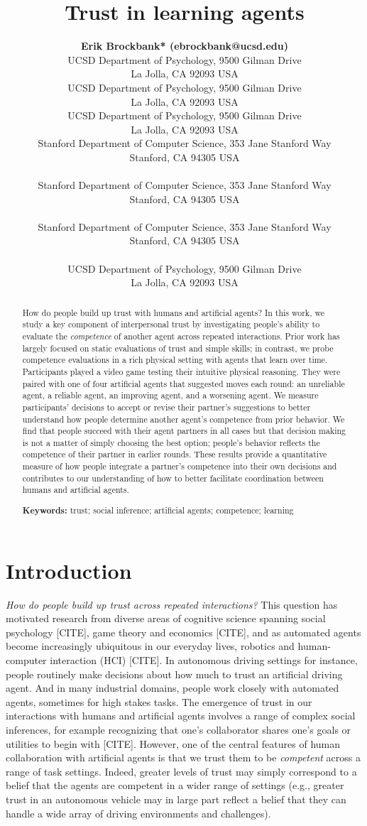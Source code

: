 \documentclass[10pt,letterpaper]{article}
\title{Trust in learning agents}
\author{
  {
  \large \bf Erik Brockbank* (ebrockbank@ucsd.edu)} \\
  UCSD Department of Psychology, 9500 Gilman Drive \\
  La Jolla, CA 92093 USA
  \AND {\large \bf Haoliang Wang* (haw027@ucsd.edu)} \\
  UCSD Department of Psychology, 9500 Gilman Drive \\
  La Jolla, CA 92093 USA
  \AND {\large \bf Justin Yang (juy003@ucsd.edu)} \\
  UCSD Department of Psychology, 9500 Gilman Drive \\
  La Jolla, CA 92093 USA
  \AND {\large \bf Suvir Mirchandani (suvir@cs.stanford.edu)} \\
  Stanford Department of Computer Science, 353 Jane Stanford Way \\
  Stanford, CA 94305 USA \\
  \AND {\large \bf Erdem Biyik (ebiyik@stanford.edu)} \\
  Stanford Department of Computer Science, 353 Jane Stanford Way \\
  Stanford, CA 94305 USA \\
  \AND {\large \bf Dorsa Sadigh (dorsa@cs.stanford.edu)} \\
  Stanford Department of Computer Science, 353 Jane Stanford Way \\
  Stanford, CA 94305 USA \\
  \AND {\large \bf Judith Fan (jefan@ucsd.edu)} \\
  UCSD Department of Psychology, 9500 Gilman Drive \\
  La Jolla, CA 92093 USA \\
}
\begin{document}
\maketitle


\begin{abstract}
How do people build up trust with humans and artificial agents? In this work, we study a key component of interpersonal trust by investigating people's ability to evaluate the \textit{competence} of another agent across repeated interactions. Prior work has largely focused on static evaluations of trust and simple skills; in contrast, we probe competence evaluations in a rich physical setting with agents that learn over time. Participants played a video game testing their intuitive physical reasoning. They were paired with one of four artificial agents that suggested moves each round: an unreliable agent, a reliable agent, an improving agent, and a worsening agent. We measure participants' decisions to accept or revise their partner's suggestions to better understand how people determine another agent's competence from prior behavior. We find that people succeed with their agent partners in all cases but that decision making is not a matter of simply choosing the best option; people's behavior reflects the competence of their partner in earlier rounds. These results provide a quantitative measure of how people integrate a partner's competence into their own decisions and contributes to our understanding of how to better facilitate coordination between humans and artificial agents.

\textbf{Keywords:} 
trust; social inference; artificial agents; competence; learning 
\end{abstract}


\section{Introduction}

\textit{How do people build up trust across repeated interactions?} This question has motivated research from diverse areas of cognitive science spanning social psychology [CITE], game theory and economics [CITE], and as automated agents become increasingly ubiquitous in our everyday lives, robotics and human-computer interaction (HCI) [CITE]. 
In autonomous driving settings for instance, people routinely make decisions about how much to trust an artificial driving agent. And in many industrial domains, people work closely with automated agents, sometimes for high stakes tasks. The emergence of trust in our interactions with humans and artificial agents involves a range of complex social inferences, for example recognizing that one's collaborator shares one's goals or utilities to begin with [CITE]. However, one of the central features of human collaboration with artificial agents is that we trust them to be \textit{competent} across a range of task settings. Indeed, greater levels of trust may simply correspond to a belief that the agents are competent in a wider range of settings (e.g., greater trust in an autonomous vehicle may in large part reflect a belief that they can handle a wide array of driving environments and challenges).
\end{document}
